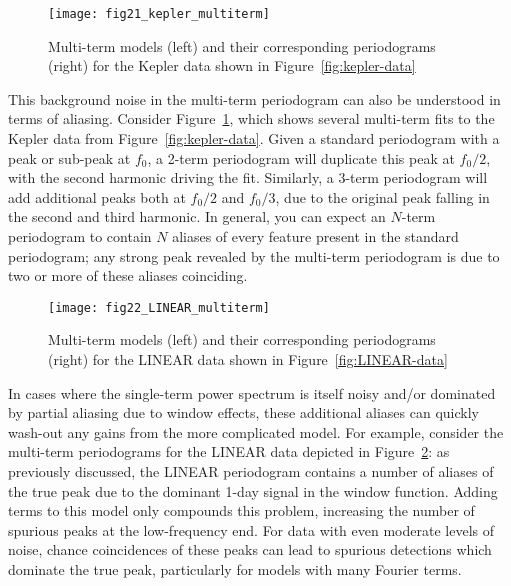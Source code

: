 \documentclass[preprint]{aastex}
\newcommand{\fig}[1]{Figure~\ref{fig:#1}}
\newcommand{\figlabel}[1]{\label{fig:#1}}
\begin{document}
\begin{figure}[ht]
  \centering
  \texttt{[image: fig21\_kepler\_multiterm]}
  \caption{Multi-term models (left) and their corresponding periodograms (right)
    for the Kepler data shown in \fig{kepler-data}
    \figlabel{kepler-multiterm}}
\end{figure}


This background noise in the multi-term periodogram can also be understood
in terms of aliasing.
Consider \fig{kepler-multiterm}, which shows several multi-term fits to the
Kepler data from \fig{kepler-data}.
Given a standard periodogram with a peak or sub-peak at $f_0$,
a 2-term periodogram will duplicate this peak at $f_0 / 2$,
with the second harmonic driving the fit.
Similarly, a 3-term periodogram will add additional peaks both at
$f_0 / 2$ and $f_0 / 3$, due to the original peak falling in the second and
third harmonic.
In general, you can expect an $N$-term periodogram to contain $N$ aliases of
every feature present in the standard periodogram; any strong peak revealed
by the multi-term periodogram is due to two or more of these aliases coinciding.

\begin{figure}[ht]
  \centering
  \texttt{[image: fig22\_LINEAR\_multiterm]}
  \caption{Multi-term models (left) and their corresponding periodograms (right)
    for the LINEAR data shown in \fig{LINEAR-data}
    \figlabel{LINEAR-multiterm}}
\end{figure}

In cases where the single-term power spectrum is itself noisy and/or dominated
by partial aliasing due to window effects, these additional aliases can
quickly wash-out any gains from the more complicated model.
For example, consider the multi-term periodograms for the LINEAR data
depicted in \fig{LINEAR-multiterm}: as previously discussed,
the LINEAR periodogram contains a number of aliases of the true peak due
to the dominant 1-day signal in the window function.
Adding terms to this model only compounds this problem, increasing the number of
spurious peaks at the low-frequency end.
For data with even moderate levels of noise, chance coincidences of these
peaks can lead to spurious detections which dominate the true peak, particularly
for models with many Fourier terms.
\end{document}
